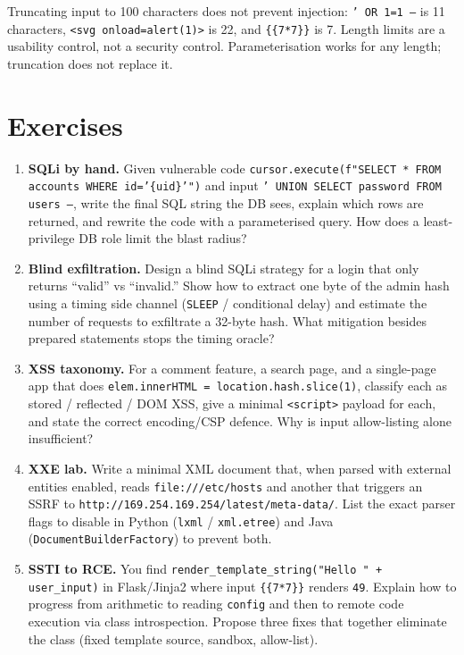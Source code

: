 \begin{remark}
Truncating input to 100 characters does not prevent injection: \texttt{' OR 1=1 --} is 11 characters, \texttt{<svg onload=alert(1)>} is 22, and \texttt{\{\{7*7\}\}} is 7. Length limits are a usability control, not a security control. Parameterisation works for any length; truncation does not replace it.
\end{remark}


\section{Exercises}\label{sec:ch03-exercises}
\begin{enumerate}[label=E3.\arabic*, leftmargin=*, itemsep=0.6em]
    \item \textbf{SQLi by hand.} Given vulnerable code \texttt{cursor.execute(f"SELECT * FROM accounts WHERE id='\{uid\}'")} and input \texttt{' UNION SELECT password FROM users --}, write the final SQL string the DB sees, explain which rows are returned, and rewrite the code with a parameterised query. How does a least-privilege DB role limit the blast radius?
    \item \textbf{Blind exfiltration.} Design a blind SQLi strategy for a login that only returns ``valid'' vs ``invalid.'' Show how to extract one byte of the admin hash using a timing side channel (\texttt{SLEEP} / conditional delay) and estimate the number of requests to exfiltrate a 32-byte hash. What mitigation besides prepared statements stops the timing oracle?
    \item \textbf{XSS taxonomy.} For a comment feature, a search page, and a single-page app that does \texttt{elem.innerHTML = location.hash.slice(1)}, classify each as stored / reflected / DOM XSS, give a minimal \texttt{<script>} payload for each, and state the correct encoding/CSP defence. Why is input allow-listing alone insufficient?
    \item \textbf{XXE lab.} Write a minimal XML document that, when parsed with external entities enabled, reads \texttt{file:///etc/hosts} and another that triggers an SSRF to \texttt{http://169.254.169.254/latest/meta-data/}. List the exact parser flags to disable in Python (\texttt{lxml} / \texttt{xml.etree}) and Java (\texttt{DocumentBuilderFactory}) to prevent both.
    \item \textbf{SSTI to RCE.} You find \texttt{render\_template\_string("Hello " + user\_input)} in Flask/Jinja2 where input \texttt{\{\{7*7\}\}} renders \texttt{49}. Explain how to progress from arithmetic to reading \texttt{config} and then to remote code execution via class introspection. Propose three fixes that together eliminate the class (fixed template source, sandbox, allow-list).
\end{enumerate}

